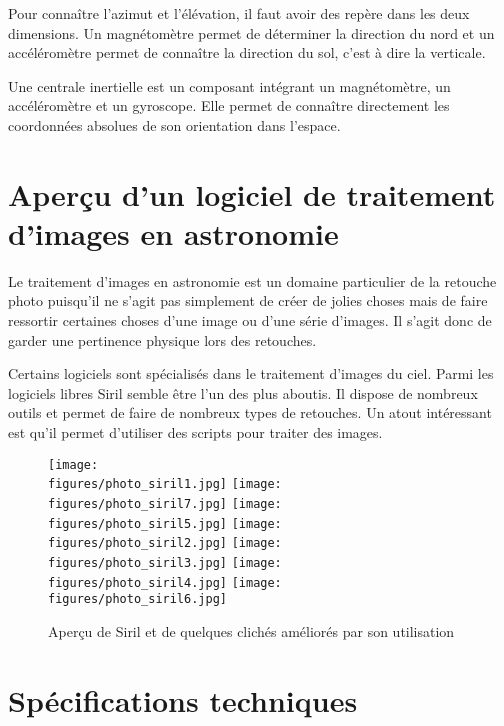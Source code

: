 \vspace{1cm}

Pour connaître l'azimut et l'élévation, il faut avoir des repère dans les deux dimensions. Un magnétomètre permet de déterminer la direction du nord et un accéléromètre permet de connaître la direction du sol, c'est à dire la verticale.

Une centrale inertielle est un composant intégrant un magnétomètre, un accéléromètre et un gyroscope. Elle permet de connaître directement les coordonnées absolues de son orientation dans l'espace.

\section{Aperçu d'un logiciel de traitement d'images en astronomie}

Le traitement d'images en astronomie est un domaine particulier de la retouche photo puisqu'il ne s'agit pas simplement de créer de jolies choses mais de faire ressortir certaines choses d'une image ou d'une série d'images. Il s'agit donc de garder une pertinence physique lors des retouches.

Certains logiciels sont spécialisés dans le traitement d'images du ciel. Parmi les logiciels libres Siril semble être l'un des plus aboutis. Il dispose de nombreux outils et permet de faire de nombreux types de retouches. Un atout intéressant est qu'il permet d'utiliser des scripts pour traiter des images.

\begin{figure}[H]
	\centering
    \texttt{[image: \\figures/photo\_siril1.jpg]}
    \texttt{[image: \\figures/photo\_siril7.jpg]}
    \texttt{[image: \\figures/photo\_siril5.jpg]}
    \texttt{[image: \\figures/photo\_siril2.jpg]}
    \texttt{[image: \\figures/photo\_siril3.jpg]}
    \texttt{[image: \\figures/photo\_siril4.jpg]}
    \texttt{[image: \\figures/photo\_siril6.jpg]}
    \decoRule
    \caption[
    Aperçu de Siril et de quelques clichés améliorés par son utilisation]{
    Aperçu de Siril et de quelques clichés améliorés par son utilisation}
    \label{fig:Aperçu de Siril et de quelques clichés améliorés par son utilisation}
	\end{figure}

\section{Spécifications techniques}

